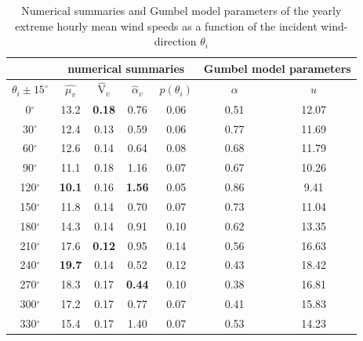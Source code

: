\begin{table}[H]                                                                                     
	\footnotesize
	\centering                                                                                            
	\caption{Numerical summaries and Gumbel model parameters of the yearly extreme hourly mean wind speeds as a function of the incident wind-direction $\theta_i$}
	\label{table:tab:V_sample_statistics_max}                                                             
	\begin{tabular}{|c|c|c|c|c|c|c|}                                                                    
		\hline
		&  \multicolumn{4}{|c|}{numerical summaries}             & \multicolumn{2}{|c|}{Gumbel model parameters} \\ \hline                                                                                              
		$\theta_i\pm15^{\circ}$ &	$\hat{\mu_v}$	&	$\hat{\text{V}}_v$	&	$\hat{\alpha}_v$	&	$p(\theta_i)$	&	$\alpha$	&	$u$	\\	\hline
		0$^{\circ}$	&	13.2	&	\textbf{0.18}	&	0.76	&	0.06	&	0.51	&	12.07	\\	\hline
		30$^{\circ}$	&	12.4	&	0.13	&	0.59	&	0.06	&	0.77	&	11.69	\\	\hline
		60$^{\circ}$	&	12.6	&	0.14	&	0.64	&	0.08	&	0.68	&	11.79	\\	\hline
		90$^{\circ}$	&	11.1	&	0.18	&	1.16	&	0.07	&	0.67	&	10.26	\\	\hline
		120$^{\circ}$	&	\textbf{10.1}	&	0.16	&	\textbf{1.56}	&	0.05	&	0.86	&	9.41	\\	\hline
		150$^{\circ}$	&	11.8	&	0.14	&	0.70	&	0.07	&	0.73	&	11.04	\\	\hline
		180$^{\circ}$	&	14.3	&	0.14	&	0.91	&	0.10	&	0.62	&	13.35	\\	\hline
		210$^{\circ}$	&	17.6	&	\textbf{0.12}	&	0.95	&	0.14	&	0.56	&	16.63	\\	\hline
		240$^{\circ}$	&	\textbf{19.7}	&	0.14	&	0.52	&	0.12	&	0.43	&	18.42	\\	\hline
		270$^{\circ}$	&	18.3	&	0.17	&	\textbf{0.44}	&	0.10	&	0.38	&	16.81	\\	\hline
		300$^{\circ}$	&	17.2	&	0.17	&	0.77	&	0.07	&	0.41	&	15.83	\\	\hline
		330$^{\circ}$	&	15.4	&	0.17	&	1.40	&	0.07	&	0.53	&	14.23	\\	\hline
	\end{tabular}
\end{table}

